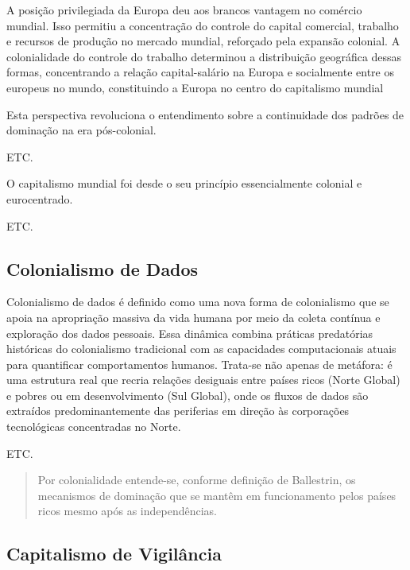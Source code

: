 A posição privilegiada da Europa deu aos brancos vantagem no comércio mundial. Isso permitiu a concentração do controle do capital comercial, trabalho e recursos de produção no mercado mundial, reforçado pela expansão colonial. A colonialidade do controle do trabalho determinou a distribuição geográfica dessas formas, concentrando a relação capital-salário na Europa e socialmente entre os europeus no mundo, constituindo a Europa no centro do capitalismo mundial


Esta perspectiva revoluciona o entendimento sobre a continuidade dos padrões de dominação na era pós-colonial.

ETC.


O capitalismo mundial foi desde o seu princípio essencialmente colonial e eurocentrado. 

ETC.


\subsection{Colonialismo de Dados}
\label{subsec:colDados}
Colonialismo de dados é definido como uma nova forma de colonialismo que se apoia na apropriação massiva da vida humana por meio da coleta contínua e exploração dos dados pessoais. Essa dinâmica combina práticas predatórias históricas do colonialismo tradicional com as capacidades computacionais atuais para quantificar comportamentos humanos. Trata-se não apenas de metáfora: é uma estrutura real que recria relações desiguais entre países ricos (Norte Global) e pobres ou em desenvolvimento (Sul Global), onde os fluxos de dados são extraídos predominantemente das periferias em direção às corporações tecnológicas concentradas no Norte. \cite{Silveira2021}

ETC.

\begin{quote}
Por colonialidade entende-se, conforme definição de Ballestrin, os mecanismos de dominação que se mantêm em funcionamento pelos países ricos mesmo após as independências. \citeauthor{Silveira2021}
\end{quote}

\subsection{Capitalismo de Vigilância}
\label{subsec:capVig}

